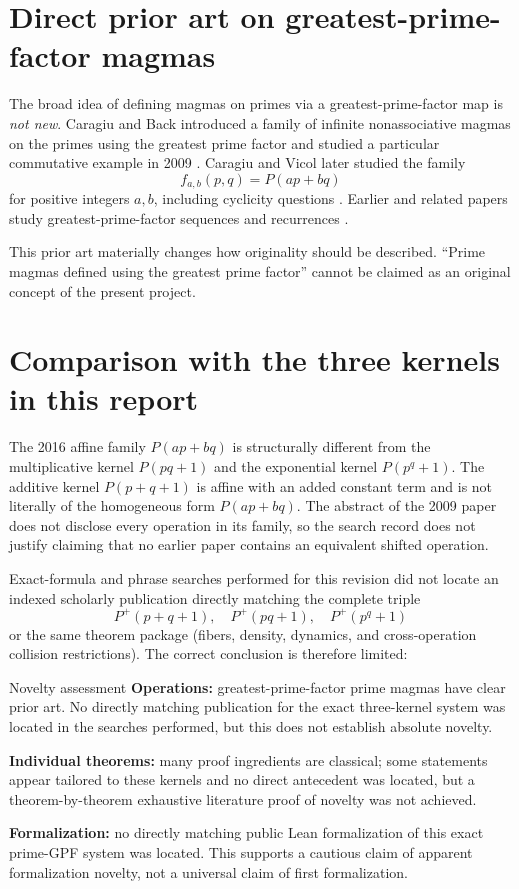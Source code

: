 \documentclass[11pt,a4paper,oneside,open=any,headings=small]{scrbook}
\theoremstyle{definition}
\begin{document}
\section{Direct prior art on greatest-prime-factor magmas}
The broad idea of defining magmas on primes via a greatest-prime-factor map is \emph{not new}. Caragiu and Back introduced a family of infinite nonassociative magmas on the primes using the greatest prime factor and studied a particular commutative example in 2009 \parencite{CaragiuBack2009}. Caragiu and Vicol later studied the family
\[
f_{a,b}(p,q)=P(ap+bq)
\]
for positive integers $a,b$, including cyclicity questions \parencite{CaragiuVicol2016}. Earlier and related papers study greatest-prime-factor sequences and recurrences \parencite{CaragiuScheckelhoff2006,BackCaragiu2010}.

This prior art materially changes how originality should be described. ``Prime magmas defined using the greatest prime factor'' cannot be claimed as an original concept of the present project.

\section{Comparison with the three kernels in this report}
The 2016 affine family $P(ap+bq)$ is structurally different from the multiplicative kernel $P(pq+1)$ and the exponential kernel $P(p^q+1)$. The additive kernel $P(p+q+1)$ is affine with an added constant term and is not literally of the homogeneous form $P(ap+bq)$. The abstract of the 2009 paper does not disclose every operation in its family, so the search record does not justify claiming that no earlier paper contains an equivalent shifted operation.

Exact-formula and phrase searches performed for this revision did not locate an indexed scholarly publication directly matching the complete triple
\[
P^+(p+q+1),\quad P^+(pq+1),\quad P^+(p^q+1)
\]
or the same theorem package (fibers, density, dynamics, and cross-operation collision restrictions). The correct conclusion is therefore limited:

\begin{statusbox}{Novelty assessment}
\textbf{Operations:} greatest-prime-factor prime magmas have clear prior art. No directly matching publication for the exact three-kernel system was located in the searches performed, but this does not establish absolute novelty.\par
\textbf{Individual theorems:} many proof ingredients are classical; some statements appear tailored to these kernels and no direct antecedent was located, but a theorem-by-theorem exhaustive literature proof of novelty was not achieved.\par
\textbf{Formalization:} no directly matching public Lean formalization of this exact prime-GPF system was located. This supports a cautious claim of apparent formalization novelty, not a universal claim of first formalization.
\end{statusbox}
\end{document}
